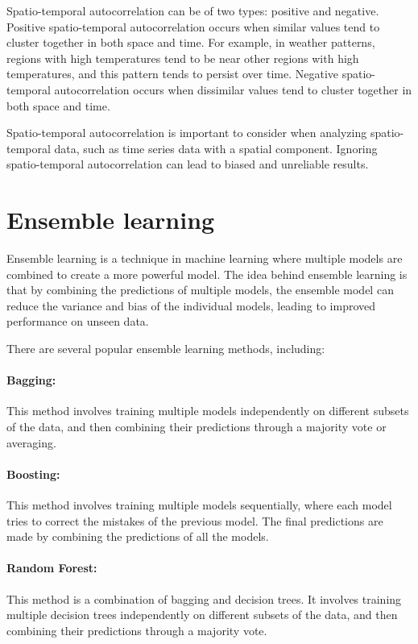 Spatio-temporal autocorrelation can be of two types: positive and negative. Positive spatio-temporal autocorrelation occurs when similar values tend to cluster together in both space and time. For example, in weather patterns, regions with high temperatures tend to be near other regions with high temperatures, and this pattern tends to persist over time. Negative spatio-temporal autocorrelation occurs when dissimilar values tend to cluster together in both space and time.

Spatio-temporal autocorrelation is important to consider when analyzing spatio-temporal data, such as time series data with a spatial component. Ignoring spatio-temporal autocorrelation can lead to biased and unreliable results.

\section{Ensemble learning}
Ensemble learning \cite{Ho2009, Sklansky2013} is a technique in machine learning where multiple models are combined to create a more powerful model. The idea behind ensemble learning is that by combining the predictions of multiple models, the ensemble model can reduce the variance and bias of the individual models, leading to improved performance on unseen data.

There are several popular ensemble learning methods, including:

\paragraph{Bagging:}This method involves training multiple models independently on different subsets of the data, and then combining their predictions through a majority vote or averaging.

\paragraph{Boosting:} This method involves training multiple models sequentially, where each model tries to correct the mistakes of the previous model. The final predictions are made by combining the predictions of all the models.

\paragraph{Random Forest:} This method is a combination of bagging and decision trees. It involves training multiple decision trees independently on different subsets of the data, and then combining their predictions through a majority vote.

